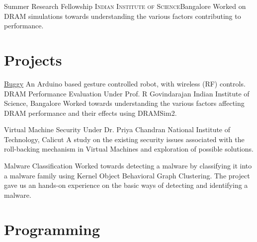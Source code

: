 \documentclass[11pt,a4paper,sans]{moderncv}
\begin{document}
                {Summer Research Fellowship}
                {\textsc{Indian Institute of Science}}{Bangalore}
                {}
                {
                    Worked on  DRAM simulations towards understanding the
                    various factors contributing to performance.
                }


\section{Projects}
    \cventry{}
            {\href{https://github.com/sachinboban/buggy}{Buggy}}
            {}
            {}
            {}
            {
                An Arduino based gesture controlled robot, with wireless (RF)
                controls.
            }
    \cventry{}
            {DRAM Performance Evaluation}
            {Under Prof. R Govindarajan}
            {Indian Institute of Science, Bangalore}
            {}
            {
                Worked towards understanding the  various factors affecting DRAM
                performance and their effects using DRAMSim2.
            }

    \cventry{}
            {Virtual Machine Security}
            {Under Dr. Priya Chandran}
            {National Institute of Technology, Calicut}
            {}
            {
                A study on the existing security issues associated with the
                roll-backing mechanism in Virtual Machines and exploration of
                possible solutions.
            }

    \cventry{}
            {Malware Classification}
            {}
            {}
            {}
            {
                Worked towards detecting a malware by classifying it into a
                malware family using Kernel Object Behavioral Graph Clustering.
                The project gave us an hands-on experience on the basic ways of
                detecting and identifying a malware.
            }


\section{Programming}
\end{document}

